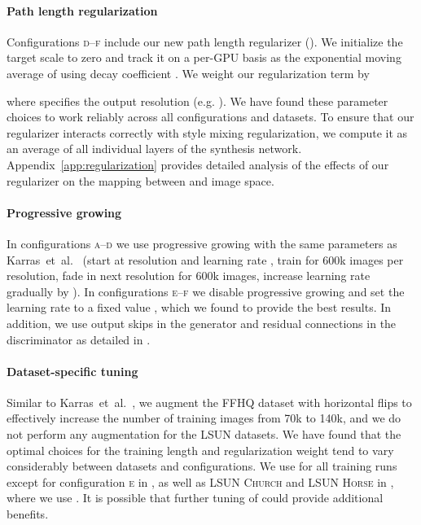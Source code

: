 \documentclass[10pt,twocolumn,letterpaper]{article}
\newcommand{\arch}[1]{\textsc{#1}}
\begin{document}
\paragraph{Path length regularization}
Configurations \arch{d}--\arch{f} include our new path length regularizer ().
We initialize the target scale  to zero and track it on a per-GPU basis as the exponential moving average of  using decay coefficient .
We weight our regularization term by

where  specifies the output resolution (e.g. ).
We have found these parameter choices to work reliably across all configurations and datasets.
To ensure that our regularizer interacts correctly with style mixing regularization, we compute it as an average of all individual layers of the synthesis network. Appendix~\ref{app:regularization} provides detailed analysis of the effects of our regularizer on the mapping between  and image space.

\paragraph{Progressive growing}
In configurations \arch{a}--\arch{d} we use progressive growing with the same parameters as Karras~et~al.~\cite{Karras2018} (start at  resolution and learning rate , train for 600k images per resolution, fade in next resolution for 600k images, increase learning rate gradually by ).
In configurations \arch{e}--\arch{f} we disable progressive growing and set the learning rate to a fixed value , which we found to provide the best results.
In addition, we use output skips in the generator and residual connections in the discriminator as detailed in .

\paragraph{Dataset-specific tuning}
Similar to Karras~et~al.~\cite{Karras2018}, we augment the \textsc{FFHQ} dataset with horizontal flips to effectively increase the number of training images from 70k to 140k, and we do not perform any augmentation for the \textsc{LSUN} datasets.
We have found that the optimal choices for the training length and  regularization weight  tend to vary considerably between datasets and configurations.
We use  for all training runs except for configuration \arch{e} in , as well as \textsc{LSUN Church} and \textsc{LSUN Horse} in , where we use .
It is possible that further tuning of  could provide additional benefits.
\end{document}

